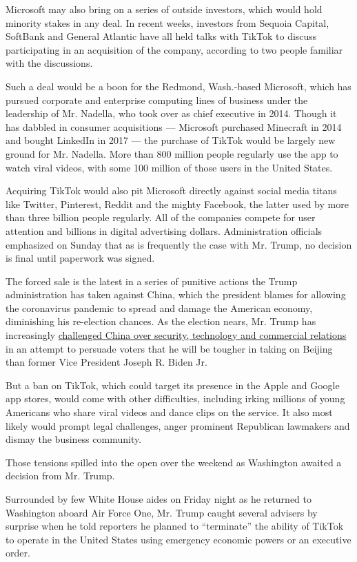 Microsoft may also bring on a series of outside investors, which would
hold minority stakes in any deal. In recent weeks, investors from
Sequoia Capital, SoftBank and General Atlantic have all held talks with
TikTok to discuss participating in an acquisition of the company,
according to two people familiar with the discussions.

Such a deal would be a boon for the Redmond, Wash.-based Microsoft,
which has pursued corporate and enterprise computing lines of business
under the leadership of Mr. Nadella, who took over as chief executive in
2014. Though it has dabbled in consumer acquisitions --- Microsoft
purchased Minecraft in 2014 and bought LinkedIn in 2017 --- the purchase
of TikTok would be largely new ground for Mr. Nadella. More than 800
million people regularly use the app to watch viral videos, with some
100 million of those users in the United States.

Acquiring TikTok would also pit Microsoft directly against social media
titans like Twitter, Pinterest, Reddit and the mighty Facebook, the
latter used by more than three billion people regularly. All of the
companies compete for user attention and billions in digital advertising
dollars. Administration officials emphasized on Sunday that as is
frequently the case with Mr. Trump, no decision is final until paperwork
was signed.

The forced sale is the latest in a series of punitive actions the Trump
administration has taken against China, which the president blames for
allowing the coronavirus pandemic to spread and damage the American
economy, diminishing his re-election chances. As the election nears, Mr.
Trump has increasingly
\href{https://www.nytimes.com/2020/07/25/world/asia/us-china-trump-xi.html}{challenged
China over security, technology and commercial relations} in an attempt
to persuade voters that he will be tougher in taking on Beijing than
former Vice President Joseph R. Biden Jr.

But a ban on TikTok, which could target its presence in the Apple and
Google app stores, would come with other difficulties, including irking
millions of young Americans who share viral videos and dance clips on
the service. It also most likely would prompt legal challenges, anger
prominent Republican lawmakers and dismay the business community.

Those tensions spilled into the open over the weekend as Washington
awaited a decision from Mr. Trump.

Surrounded by few White House aides on Friday night as he returned to
Washington aboard Air Force One, Mr. Trump caught several advisers by
surprise when he told reporters he planned to ``terminate'' the ability
of TikTok to operate in the United States using emergency economic
powers or an executive order.

